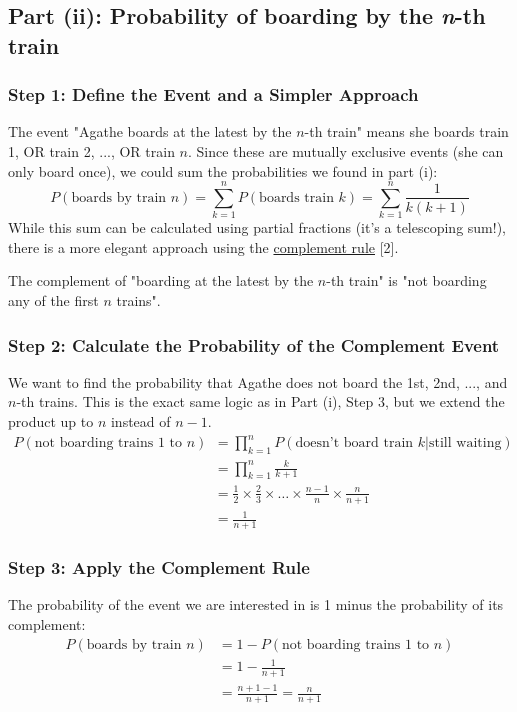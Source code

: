 \documentclass[11pt,a4paper]{article}
\begin{document}
\subsection{Part (ii): Probability of boarding by the \textit{n}-th train}

\subsubsection*{Step 1: Define the Event and a Simpler Approach}
The event "Agathe boards at the latest by the $n$-th train" means she boards train 1, OR train 2, ..., OR train $n$. Since these are mutually exclusive events (she can only board once), we could sum the probabilities we found in part (i):
$$ P(\text{boards by train } n) = \sum_{k=1}^{n} P(\text{boards train } k) = \sum_{k=1}^{n} \frac{1}{k(k+1)} $$
While this sum can be calculated using partial fractions (it's a telescoping sum!), there is a more elegant approach using the \hyperlink{note2}{complement rule} [2].

The complement of "boarding at the latest by the $n$-th train" is "not boarding any of the first $n$ trains".

\subsubsection*{Step 2: Calculate the Probability of the Complement Event}
We want to find the probability that Agathe does not board the 1st, 2nd, ..., and $n$-th trains. This is the exact same logic as in Part (i), Step 3, but we extend the product up to $n$ instead of $n-1$.
\begin{align*}
    P(\text{not boarding trains } 1 \text{ to } n) &= \prod_{k=1}^{n} P(\text{doesn't board train } k | \text{still waiting}) \\
    &= \prod_{k=1}^{n} \frac{k}{k+1} \\
    &= \frac{1}{2} \times \frac{2}{3} \times \dots \times \frac{n-1}{n} \times \frac{n}{n+1} \\
    &= \frac{1}{n+1}
\end{align*}

\subsubsection*{Step 3: Apply the Complement Rule}
The probability of the event we are interested in is 1 minus the probability of its complement:
\begin{align*}
    P(\text{boards by train } n) &= 1 - P(\text{not boarding trains } 1 \text{ to } n) \\
    &= 1 - \frac{1}{n+1} \\
    &= \frac{n+1 - 1}{n+1} = \frac{n}{n+1}
\end{align*}
\end{document}
